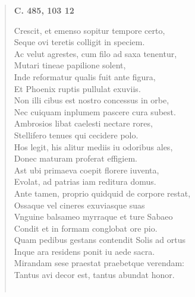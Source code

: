 \documentclass[11pt, a4paper]{report}
\begin{document}
\begin{verse}
    \begin{center} \textbf{C. 485, 103 12} \end{center} \marginpar{[25]} Crescit, et emenso sopitur tempore certo, \\ Seque ovi teretis colligit in speciem. \\ Ac velut agrestes, cum filo ad saxa tenentur, \\ Mutari tineae papilione solent, \\ Inde reformatur qualis fuit ante figura, \\ Et Phoenix ruptis pullulat exuviis. \\ Non illi cibus est nostro concessus in orbe, \\ Nec cuiquam inplumem pascere cura subest. \\ Ambrosios libat caelesti nectare rores, \\ Stellifero tenues qui cecidere polo. \\ Hos legit, his alitur mediis iu odoribus ales, \\ Donec maturam proferat effigiem. \\ Ast ubi primaeva coepit florere iuventa, \\ Evolat, ad patrias iam reditura domus. \\ Ante tamen, proprio quidquid de corpore restat, \\ Ossaque vel cineres exuviasque suas \\ Vnguine balsameo myrraque et ture Sabaeo \\ Condit et in formam conglobat ore pio. \\ Quam pedibus gestans contendit Solis ad ortus \\ Inque ara residens ponit iu aede sacra. \\ Mirandam sese praestat praebetque verendam: \\ Tantus avi decor est, tantus abundat honor. \\ 
        ﻿\pagebreak 

\end{verse}
\end{document}
